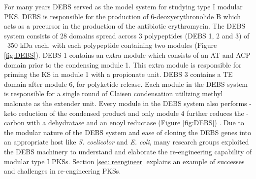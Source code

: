 			For many years DEBS served as the model system for studying type I modular PKS. DEBS is responsible for the production of 6-deoxyerythronolide B which acts as a precursor in the production of the  antibiotic erythromycin. The DEBS system consists of 28 domains spread across 3 polypeptides (DEBS 1, 2 and 3) of ~350 kDa each, with each polypeptide containing two modules (Figure \ref{fig:DEBS}). DEBS 1 contains an extra module which consists of an AT and ACP domain prior to the condensing module 1. This extra module is responsible for priming the KS in module 1 with a propionate unit. DEBS 3 contains a TE domain after module 6, for polyketide release. Each module in the DEBS system is responsible for a single round of Claisen condensation utilizing methyl malonate as the extender unit. Every module in the DEBS system also performs \bet-keto reduction of the condensed product and only module 4 further reduces the \bet-carbon with a dehydratase and an enoyl reductase (Figure \ref{fig:DEBS}) \parencite{Khosla2007}. Due to the modular nature of the DEBS system and ease of cloning the DEBS genes into an appropriate host like \textit{S. coelicolor} and \textit{E. coli}, many research groups exploited the DEBS machinery to understand and elaborate the re-engineering capability of modular type I PKSs. Section \ref{sec: reengineer} explains an example of successes and challenges in re-engineering PKSs.  
			
